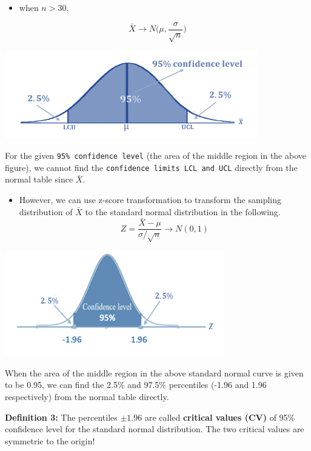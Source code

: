 \documentclass[
]{book}
\providecommand{\tightlist}{%
  \setlength{\itemsep}{0pt}\setlength{\parskip}{0pt}}
\begin{document}
\begin{itemize}
\tightlist
\item
  when \(n > 30\),
\end{itemize}

\[
\bar{X} \to N\Big(\mu, \frac{\sigma}{\sqrt{n}}\Big)
\]

\begin{center}\includegraphics[width=0.6\linewidth]{week06/samplingConfLimits} \end{center}

For the given \texttt{95\%\ confidence\ level} (the area of the middle region in the above figure), we cannot find the \texttt{confidence\ limits\ LCL\ and\ UCL} directly from the normal table since \(\bar{X}\).

\begin{itemize}
\tightlist
\item
  However, we can use z-score transformation to transform the sampling distribution of \(\bar{X}\) to the standard normal distribution in the following.
  \[
  Z = \frac{\bar{X}-\mu}{\sigma/\sqrt{n}} \to N(0, 1)
  \]
\end{itemize}

\begin{center}\includegraphics[width=0.6\linewidth]{week06/stdNormConfLimits} \end{center}

When the area of the middle region in the above standard normal curve is given to be 0.95, we can find the 2.5\% and 97.5\% percentiles (-1.96 and 1.96 respectively) from the normal table directly.

\textbf{Definition 3: } The percentiles \(\pm 1.96\) are called \textbf{critical values (CV)} of 95\% confidence level for the standard normal distribution. The two critical values are symmetric to the origin!
\end{document}
